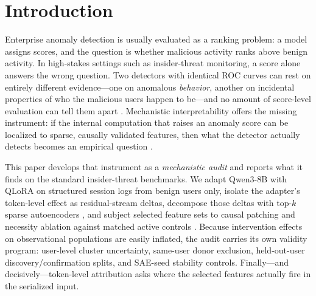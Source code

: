 \documentclass[10pt]{article} %
\newcommand{\rsix}{r6.2}
\newcommand{\rfour}{r4.2}
\begin{document}
\begin{abstract}
descriptive user-level bootstrap interval excluding zero); the same removal
has a much smaller, non-significant effect in the audited Qwen2.5-3B run, a
model-dependent difference the design does not attribute to capacity alone.
On raw enterprise authentication logs with no injected profile (LANL), a
seen-versus-unseen gap appears but cannot yet be attributed: its evaluation
pools differ in user composition as well as training exposure. The score-level
consequence is stark: compared only against benign users unseen during
adaptation, day-level ROC-AUC falls from $0.95$ to $0.55$ (\rsix{}) and
from $0.96$ to $0.67$ (\rfour{})---apparent strength is largely a
seen-versus-unseen-user effect---and score-time profile masking
\emph{improves} \rfour{}'s unseen-user discrimination. High
anomaly-ranking performance can thus conceal qualitatively
different---and sometimes identity-proxy---internal evidence; mechanistic
auditing makes the difference visible.
\end{abstract}

\section{Introduction}

Enterprise anomaly detection is usually evaluated as a ranking problem: a model
assigns scores, and the question is whether malicious activity ranks above
benign activity. In high-stakes settings such as insider-threat monitoring, a
score alone answers the wrong question. Two detectors with identical ROC
curves can rest on entirely different evidence---one on anomalous
\emph{behavior}, another on incidental properties of who the malicious users
happen to be---and no amount of score-level evaluation can tell them apart
\citep{chandola2009anomaly,yuan2021deep}. Mechanistic interpretability offers
the missing instrument: if the internal computation that raises an anomaly
score can be localized to sparse, causally validated features, then what the
detector actually detects becomes an empirical question
\citep{olah2020zoom,bricken2023monosemanticity}.

This paper develops that instrument as a \emph{mechanistic audit} and reports
what it finds on the standard insider-threat benchmarks. We adapt Qwen3-8B
\citep{qwen3} with QLoRA \citep{hu2022lora,dettmers2023qlora} on structured
session logs from benign users only, isolate the adapter's token-level effect
as residual-stream deltas, decompose those deltas with top-$k$ sparse
autoencoders \citep{gao2024scaling}, and subject selected feature sets to
causal patching and necessity ablation against matched active controls
\citep{zhang2023best}. Because intervention effects on observational
populations are easily inflated, the audit carries its own validity program:
user-level cluster uncertainty, same-user donor exclusion, held-out-user
discovery/confirmation splits, and SAE-seed stability controls. Finally---and
decisively---token-level attribution asks where the selected
features actually fire in the serialized input.
\end{document}

